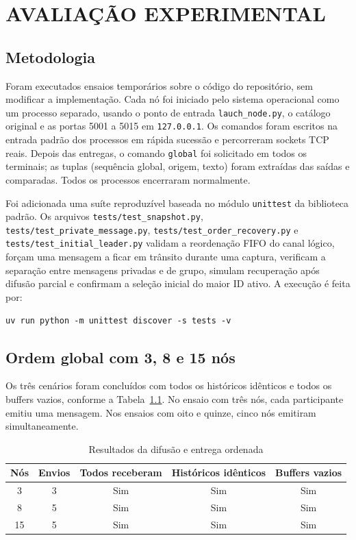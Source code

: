\chapter{AVALIAÇÃO EXPERIMENTAL}\label{chap:avaliacao}

\section{Metodologia}

Foram executados ensaios temporários sobre o código do repositório, sem modificar
a implementação. Cada nó foi iniciado pelo sistema operacional como um processo
separado, usando o ponto de entrada \texttt{lauch\_node.py}, o catálogo original e
as portas 5001 a 5015 em \texttt{127.0.0.1}. Os comandos foram escritos na entrada
padrão dos processos em rápida sucessão e percorreram sockets TCP reais. Depois
das entregas, o comando \texttt{global} foi solicitado em todos os terminais; as
tuplas (sequência global, origem, texto) foram extraídas das saídas e comparadas.
Todos os processos encerraram normalmente.

Foi adicionada uma suíte reproduzível baseada no módulo \texttt{unittest} da
biblioteca padrão. Os arquivos \texttt{tests/test\_snapshot.py},
\texttt{tests/test\_private\_message.py},
\texttt{tests/test\_order\_recovery.py} e
\texttt{tests/test\_initial\_leader.py} validam a reordenação FIFO do canal lógico,
forçam uma mensagem a ficar em trânsito durante uma captura, verificam a separação
entre mensagens privadas e de grupo, simulam recuperação após difusão parcial e
confirmam a seleção inicial do maior ID ativo. A execução é feita por:

\begin{lstlisting}[style=bash, numbers=none]
uv run python -m unittest discover -s tests -v
\end{lstlisting}

\section{Ordem global com 3, 8 e 15 nós}

Os três cenários foram concluídos com todos os históricos idênticos e todos os
buffers vazios, conforme a Tabela~\ref{tab:testes-ordem}. No ensaio com três nós,
cada participante emitiu uma mensagem. Nos ensaios com oito e quinze, cinco nós
emitiram simultaneamente.

\begin{table}[H]
    \centering
    \caption{Resultados da difusão e entrega ordenada}
    \label{tab:testes-ordem}
    \begin{tabular}{ccccc}
        \toprule
        \textbf{Nós} & \textbf{Envios} & \textbf{Todos receberam} &
        \textbf{Históricos idênticos} & \textbf{Buffers vazios} \\
        \midrule
        3  & 3 & Sim & Sim & Sim \\
        8  & 5 & Sim & Sim & Sim \\
        15 & 5 & Sim & Sim & Sim \\
        \bottomrule
    \end{tabular}
\end{table}

